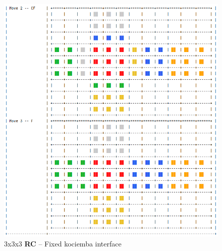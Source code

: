 \begin{figure}[H]
\centering
\includegraphics[scale=0.5]{./Figures/KociembaBug333Fix2}
\caption[Kociemba Bug Fix]{3x3x3 \textbf{RC} -- Fixed kociemba interface}
\label{fig:KociembaBug333Fix2}
\end{figure}











